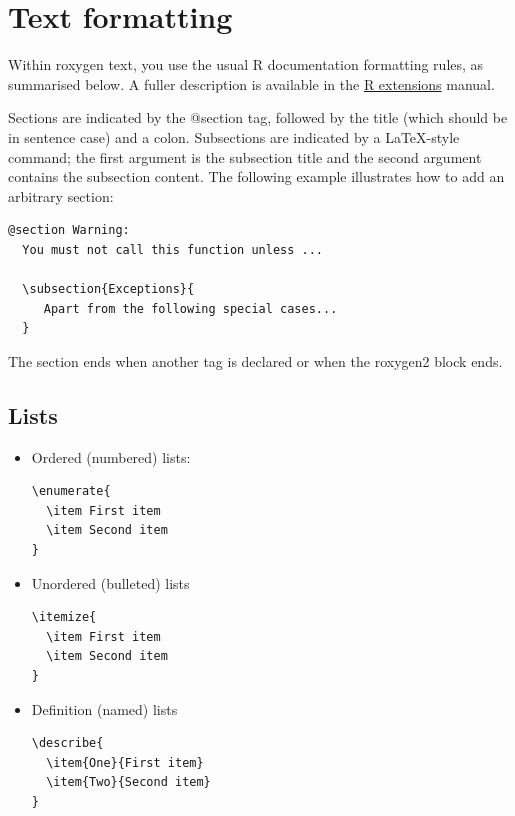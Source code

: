 \section{Text formatting}

Within roxygen text, you use the usual R documentation formatting rules,
as summarised below. A fuller description is available in the
\href{http://cran.r-project.org/doc/manuals/R-exts.html\#Sectioning}{R
extensions} manual.

Sections are indicated by the @section tag, followed by the title (which
should be in sentence case) and a colon. Subsections are indicated by a
LaTeX-style command; the first argument is the subsection title and the
second argument contains the subsection content. The following example
illustrates how to add an arbitrary section:

\begin{verbatim}
@section Warning:
  You must not call this function unless ...
  
  \subsection{Exceptions}{
     Apart from the following special cases...
  }
\end{verbatim}

The section ends when another tag is declared or when the roxygen2 block
ends.

\subsection{Lists}

\begin{itemize}
\item
  Ordered (numbered) lists:

\begin{verbatim}
\enumerate{
  \item First item
  \item Second item
}
\end{verbatim}
\item
  Unordered (bulleted) lists

\begin{verbatim}
\itemize{
  \item First item
  \item Second item
}
\end{verbatim}
\item
  Definition (named) lists

\begin{verbatim}
\describe{
  \item{One}{First item}
  \item{Two}{Second item}
}
\end{verbatim}
\end{itemize}

